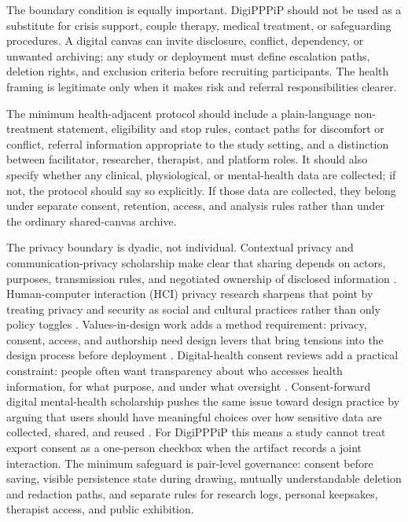 \documentclass[
  english,
]{article}
\begin{document}
The boundary condition is equally important. DigiPPPiP should not be
used as a substitute for crisis support, couple therapy, medical
treatment, or safeguarding procedures. A digital canvas can invite
disclosure, conflict, dependency, or unwanted archiving; any study or
deployment must define escalation paths, deletion rights, and exclusion
criteria before recruiting participants. The health framing is
legitimate only when it makes risk and referral responsibilities
clearer.

The minimum health-adjacent protocol should include a plain-language
non-treatment statement, eligibility and stop rules, contact paths for
discomfort or conflict, referral information appropriate to the study
setting, and a distinction between facilitator, researcher, therapist,
and platform roles. It should also specify whether any clinical,
physiological, or mental-health data are collected; if not, the protocol
should say so explicitly. If those data are collected, they belong under
separate consent, retention, access, and analysis rules rather than
under the ordinary shared-canvas archive.

The privacy boundary is dyadic, not individual. Contextual privacy and
communication-privacy scholarship make clear that sharing depends on
actors, purposes, transmission rules, and negotiated ownership of
disclosed information
\citep{nissenbaum2011contextualprivacy, petronio2020cpm}. Human-computer
interaction (HCI) privacy research sharpens that point by treating
privacy and security as social and cultural practices rather than only
policy toggles \citep{dourish2006collectiveprivacy}. Values-in-design
work adds a method requirement: privacy, consent, access, and authorship
need design levers that bring tensions into the design process before
deployment \citep{shilton2012values}. Digital-health consent reviews add
a practical constraint: people often want transparency about who
accesses health information, for what purpose, and under what oversight
\citep{kassam2023digitalconsent}. Consent-forward digital mental-health
scholarship pushes the same issue toward design practice by arguing that
users should have meaningful choices over how sensitive data are
collected, shared, and reused \citep{pendse2024consentforward}. For
DigiPPPiP this means a study cannot treat export consent as a one-person
checkbox when the artifact records a joint interaction. The minimum
safeguard is pair-level governance: consent before saving, visible
persistence state during drawing, mutually understandable deletion and
redaction paths, and separate rules for research logs, personal
keepsakes, therapist access, and public exhibition.
\end{document}
